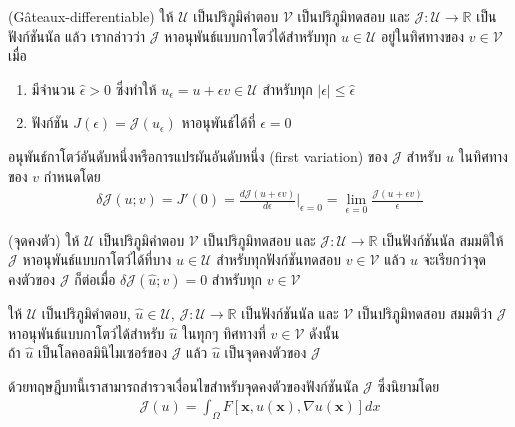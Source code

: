\begin{Definition}
    (G\^{a}teaux-differentiable)
    ให้ $\mathcal{U}$ เป็นปริภูมิคำตอบ $\mathcal{V}$ เป็นปริภูมิทดสอบ และ $\mathcal{J} : \mathcal{U} \rightarrow \mathbb{R}$ เป็นฟังก์ชันนัล แล้ว เรากล่าวว่า $\mathcal{J}$ หาอนุพันธ์แบบกาโตว์ได้สำหรับทุก $u \in \mathcal{U}$ อยู่ในทิศทางของ $v \in \mathcal{V}$ เมื่อ
    \begin{enumerate}
        \item มีจำนวน $\hat{\epsilon} > 0$ ซึ่งทำให้ $u_{\epsilon} = u + \epsilon v \in \mathcal{U}$ สำหรับทุก $|\epsilon| \leq \hat{\epsilon}$
        \item ฟังก์ชัน $J(\epsilon) = \mathcal{J}(u_\epsilon)$ หาอนุพันธ์ได้ที่ $\epsilon = 0$
    \end{enumerate}
    อนุพันธ์กาโตว์อันดับหนึ่งหรือการแปรผันอันดับหนึ่ง (first variation) ของ $\mathcal{J}$ สำหรับ $u$ ในทิศทางของ $v$ กำหนดโดย
    \begin{align*}
        \delta \mathcal{J}(u;v) =J'(0) = \frac{d\mathcal{J}(u + \epsilon v)}{d \epsilon} \Big|_{\epsilon = 0} = \lim_{\epsilon = 0}\frac{\mathcal{J}(u + \epsilon v)}{\epsilon} 
    \end{align*}
\end{Definition}

\begin{Definition}
(จุดคงตัว) ให้ $\mathcal{U}$ เป็นปริภูมิคำตอบ $\mathcal{V}$ เป็นปริภูมิทดสอบ และ $\mathcal{J} : \mathcal{U} \rightarrow \mathbb{R}$ เป็นฟังก์ชันนัล สมมติให้ $\mathcal{J}$ หาอนุพันธ์แบบกาโตว์ได้ที่บาง $\hat{u} \in \mathcal{U}$ สำหรับทุกฟังก์ชันทดสอบ $v \in \mathcal{V}$ แล้ว $\hat{u}$ จะเรียกว่าจุดคงตัวของ $\mathcal{J}$ ก็ต่อเมื่อ $\delta\mathcal{J}(\hat{u};v) = 0$ สำหรับทุก $v \in \mathcal{V}$
\end{Definition}

\begin{Theorem}
    ให้ $\mathcal{U}$ เป็นปริภูมิคำตอบ, $\hat{u} \in \mathcal{U}$, $\mathcal{J} : \mathcal{U} \rightarrow \mathbb{R}$ เป็นฟังก์ชันนัล และ $\mathcal{V}$ เป็นปริภูมิทดสอบ สมมติว่า $\mathcal{J}$ หาอนุพันธ์แบบกาโตว์ได้สำหรับ $\hat{u}$ ในทุกๆ ทิศทางที่ $v \in \mathcal{V}$ ดังนั้น \\
    \hspace*{1cm} ถ้า $\hat{u}$ เป็นโลคอลมินิไมเซอร์ของ $\mathcal{J}$ แล้ว $\hat{u}$ เป็นจุดคงตัวของ  $\mathcal{J}$ 
    \label{theroem:nessery_minimizer}
\end{Theorem}
\hspace{1cm} ด้วยทฤษฎีบทนี้เราสามารถสำรวจเงื่อนไขสำหรับจุดคงตัวของฟังก์ชันนัล $\mathcal{J}$ ซึ่งนิยามโดย
\begin{align}
    \mathcal{J}(u) = \int_{\Omega} F[\boldsymbol{x},u(\boldsymbol{x}),\nabla u(\boldsymbol{x})] dx
    \label{equation:general_functional}
\end{align}

